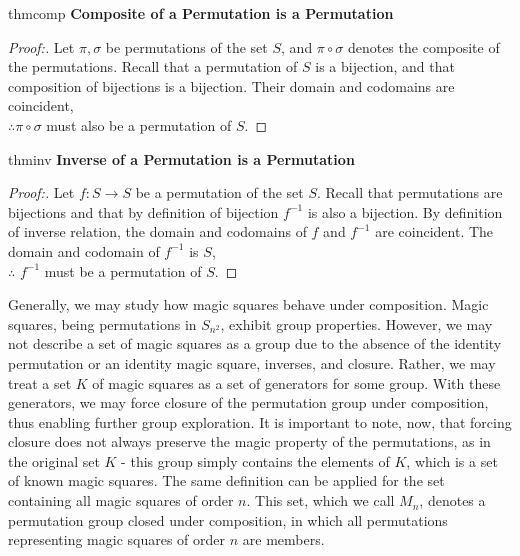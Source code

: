 \documentclass[12pt]{report}
\begin{document}
\singlespacing{}
\begin{thmbox}{}{thmcomp}
  \textbf{Composite of a Permutation is a Permutation}
  \begin{proof}[Proof:]
    Let $\pi,\sigma$ be permutations of the set $S$, and $\pi\circ\sigma$ denotes the composite of
    the permutations. Recall that a permutation of $S$ is a bijection, and that composition of
    bijections is a bijection. Their domain and codomains are coincident,\\ $\therefore
      \pi\circ\sigma$
    must also be a permutation of $S$.
  \end{proof}
\end{thmbox}
\doublespacing{}

\singlespacing{}
\begin{thmbox}{}{thminv}
  \textbf{Inverse of a Permutation is a Permutation}
  \begin{proof}[Proof:]
    Let $f : S \rightarrow S$ be a permutation of the set $S$. Recall that permutations are
    bijections and that by definition of bijection $f^{-1}$ is also a bijection. By definition of
    inverse relation, the domain and codomains of $f$ and $f^{-1}$ are coincident. The domain and
    codomain of $f^{-1}$ is $S$,\\ $\therefore$ $f^{-1}$ must be a permutation of $S$.
  \end{proof}
\end{thmbox}
\doublespacing{}

\par Generally, we may study how magic squares behave under composition. Magic squares, being
permutations in $S_{n^2}$, exhibit group properties. However, we may not describe a set of magic
squares as a group due to the absence of the identity permutation or an identity magic square,
inverses, and closure. Rather, we may treat a set $K$ of magic squares as a set of generators for
some group. With these generators, we may force closure of the permutation group under composition,
thus enabling further group exploration. It is important to note, now, that forcing closure does
not always preserve the magic property of the permutations, as in the original set $K$ \hyphen{}
this group simply contains the elements of $K$, which is a set of known magic squares. The same
definition can be applied for the set containing all magic squares of order $n$. This set, which we
call $M_n$, denotes a permutation group closed under composition, in which all permutations
representing magic squares of order $n$ are members.
\end{document}
